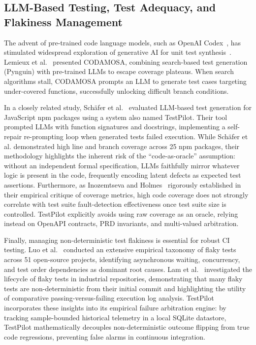 \documentclass[12pt,onecolumn,draftclsnofoot]{IEEEtran}
\begin{document}
\subsection{LLM-Based Testing, Test Adequacy, and Flakiness Management}
The advent of pre-trained code language models, such as OpenAI Codex~\cite{chen2021evaluating}, has stimulated widespread exploration of generative AI for unit test synthesis~\cite{lemieux2023codamosa,schafer2024empirical}. Lemieux et al.~\cite{lemieux2023codamosa} presented CODAMOSA, combining search-based test generation (Pynguin) with pre-trained LLMs to escape coverage plateaus. When search algorithms stall, CODAMOSA prompts an LLM to generate test cases targeting under-covered functions, successfully unlocking difficult branch conditions. 

In a closely related study, Sch{\"a}fer et al.~\cite{schafer2024empirical} evaluated LLM-based test generation for JavaScript npm packages using a system also named TestPilot. Their tool prompted LLMs with function signatures and docstrings, implementing a self-repair re-prompting loop when generated tests failed execution. While Sch{\"a}fer et al. demonstrated high line and branch coverage across 25 npm packages, their methodology highlights the inherent risk of the ``code-as-oracle'' assumption: without an independent formal specification, LLMs faithfully mirror whatever logic is present in the code, frequently encoding latent defects as expected test assertions. Furthermore, as Inozemtseva and Holmes~\cite{inozemtseva2014coverage} rigorously established in their empirical critique of coverage metrics, high code coverage does not strongly correlate with test suite fault-detection effectiveness once test suite size is controlled. TestPilot explicitly avoids using raw coverage as an oracle, relying instead on OpenAPI contracts, PRD invariants, and multi-valued arbitration.

Finally, managing non-deterministic test flakiness is essential for robust CI testing. Luo et al.~\cite{luo2014empirical} conducted an extensive empirical taxonomy of flaky tests across 51 open-source projects, identifying asynchronous waiting, concurrency, and test order dependencies as dominant root causes. Lam et al.~\cite{lam2020study,lam2019root} investigated the lifecycle of flaky tests in industrial repositories, demonstrating that many flaky tests are non-deterministic from their initial commit and highlighting the utility of comparative passing-versus-failing execution log analysis. TestPilot incorporates these insights into its empirical failure arbitration engine: by tracking sample-bounded historical telemetry in a local SQLite datastore, TestPilot mathematically decouples non-deterministic outcome flipping from true code regressions, preventing false alarms in continuous integration.
\end{document}
